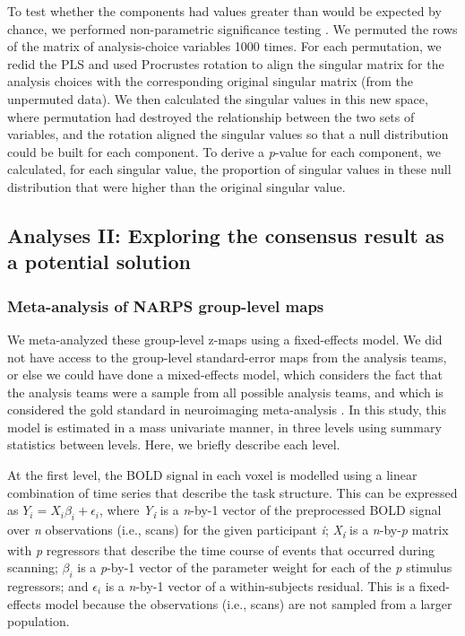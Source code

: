\documentclass[a4paper,doc,natbib]{apa6}
\begin{document}
To test whether the components had values greater than would be expected by chance, we performed non-parametric significance testing \citep{mirchi2018tracking, nichols2002nonparametric}. We permuted the rows of the matrix of analysis-choice variables 1000 times. For each permutation, we redid the PLS and used Procrustes rotation to align the singular matrix for the analysis choices with the corresponding original singular matrix (from the unpermuted data). We then calculated the singular values in this new space, where permutation had destroyed the relationship between the two sets of variables, and the rotation aligned the singular values so that a null distribution could be built for each component. To derive a \textit{p}-value for each component, we calculated, for each singular value, the proportion of singular values in these null distribution that were higher than the original singular value.


\subsection{Analyses II: Exploring the consensus result as a potential solution}
\subsubsection{Meta-analysis of NARPS group-level maps} 

We meta-analyzed these group-level z-maps using a fixed-effects model. We did not have access to the group-level standard-error maps from the analysis teams, or else we could have done a mixed-effects model, which considers the fact that the analysis teams were a sample from all possible analysis teams, and which is considered the gold standard in neuroimaging meta-analysis \citep{salimi-khorshidi_meta-analysis_2009}. In this study, this model is estimated in a mass univariate manner, in three levels using summary statistics between levels. Here, we briefly describe each level. 

At the first level, the BOLD signal in each voxel is modelled using a linear combination of time series that describe the task structure. This can be expressed as $ Y_{i}=X_{i} \beta_{i} + \epsilon_{i}$, where \textit{Y\textsubscript{i}} is a \textit{n}-by-1 vector of the preprocessed BOLD signal over \textit{n} observations (i.e., scans) for the given participant \textit{i}; \textit{X\textsubscript{i}} is a \textit{n}-by-\textit{p} matrix with \textit{p} regressors that describe the time course of events that occurred during scanning; \textit{$\beta_i$} is a \textit{p}-by-1 vector of the parameter weight for each of the \textit{p} stimulus regressors; and \textit{$\epsilon_i$} is a \textit{n}-by-1 vector of a within-subjects residual. This is a fixed-effects model because the observations (i.e., scans) are not sampled from a larger population. 
\end{document}
